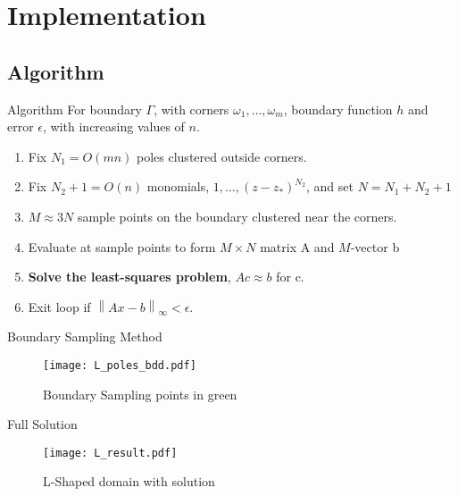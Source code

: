 \documentclass[envcountsect notes]{beamer}       %
\newcommand{\norm}[1]{\left\lVert#1\right\rVert}
\begin{document}

\section{Implementation}

\subsection{Algorithm}

\begin{frame}{Algorithm}
    For boundary $\Gamma$, with corners $\omega_1, \dots, \omega_m$, boundary function 
    $h$ and error $\epsilon$, with increasing values of $n$. 
    \begin{enumerate}
        \item Fix $N_1=O(mn)$ poles clustered outside corners.
        \item Fix $N_2+1=O(n)$ monomials, $1, \dots, (z-z_*)^{N_2}$, and set $N = N_1 + N_2 + 1$
        \item $M \approx 3N$ sample points on the boundary clustered near the corners.
        \item Evaluate at sample points to form $M \times N$ matrix A and $M$-vector b
        \item \textbf{Solve the least-squares problem}, $Ac \approx b$ for c.
        \item Exit loop if $\norm{Ax - b}_\infty < \epsilon$.
    \end{enumerate}
\end{frame}

\begin{frame}{Boundary Sampling Method}
    \begin{figure}[t]
        \texttt{[image: L\_poles\_bdd.pdf]}
        \vspace{-3em}
        \caption*{Boundary Sampling points in green}
    \end{figure}
\end{frame}

\begin{frame}{Full Solution}
    \begin{figure}[t]
        \texttt{[image: L\_result.pdf]}
        \vspace{-3em}
        \caption*{L-Shaped domain with solution}
    \end{figure}
\end{frame}
\end{document}
